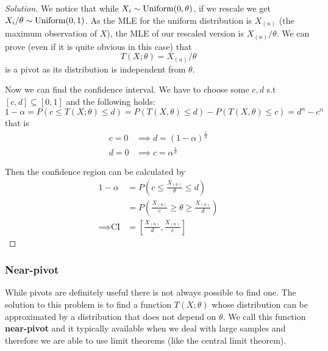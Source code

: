 \documentclass[12pt]{extarticle}
\newcommand{\Uniform}{{\operatorfont Uniform}}
\begin{document}
\begin{proof}[Solution]
	We notice that while $X_i \sim \Uniform(0, \theta)$, if we rescale we get $X_i/ \theta \sim \Uniform(0,1)$.
	As the MLE for the uniform distribution is $X_{(n)}$ (the maximum observation of $X$), the MLE of our rescaled version is $X_{(n)} / \theta$.
	We can prove (even if it is quite obvious in this case) that
	\begin{equation}
		T(X; \theta) = X_{(n)} / \theta
	\end{equation}
	is a pivot as its distribution is independent from $\theta$.

	Now we can find the confidence interval.
	We have to choose some $c, d$ s.t $[c, d] \subseteq [0, 1]$ and the following holds:
	\begin{equation}
		1 - \alpha =  P(c \leq T(X; \theta) \leq d) = P (T(X, \theta) \leq d) - P (T(X, \theta) \leq c) = d^n - c^n
	\end{equation}
	that is
	\begin{align}
		c = 0 & \implies d = (1- \alpha)^{\frac{1}{n}} \\
		d = 0 & \implies c = \alpha^{\frac{1}{n}}
	\end{align}

	Then the confidence region can be calculated by
	\begin{align}
		1 - \alpha         & = P\left(c \leq \frac{X_{(n)}}{\theta} \leq d\right)                  \\
		                   & = P\left(\frac{X_{(n)}}{c} \geq \theta \geq \frac{X_{(n)}}{d} \right) \\
		\implies \text{CI} & = \left[ \frac{X_{(n)}}{d}, \frac{X_{(n)}}{c} \right]
	\end{align}
\end{proof}

\subsubsection{Near-pivot}

While pivots are definitely useful there is not always possible to find one.
The solution to this problem is to find a function $T(X; \theta)$ whose distribution can be approximated by a distribution that does not depend on $\theta$.
We call this function \textbf{near-pivot} and it typically available when we deal with large samples and therefore we are able to use limit theorems (like the central limit theorem).
\end{document}
